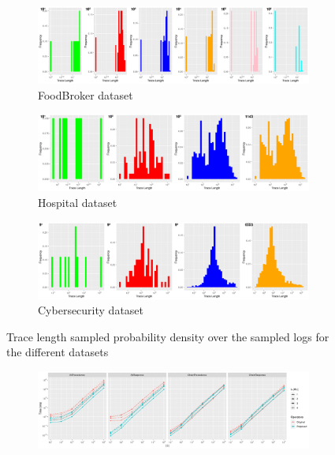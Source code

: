 \documentclass[sigconf]{acmart}
\begin{document}
\begin{figure}[!t]
\centering
\begin{subfigure}{\textwidth}
\centering
\includegraphics[width=\textwidth]{images/BrokerPDF.png}
\caption{FoodBroker dataset}\label{fbPDF}
\end{subfigure}
\begin{subfigure}{\textwidth}
\centering
\includegraphics[width=\textwidth]{images/HospitalPDF.png}
\caption{Hospital dataset}\label{hPDF}
\end{subfigure}
\begin{subfigure}{\textwidth}
\centering
\includegraphics[width=\textwidth]{images/CyberPDF.png}
\caption{Cybersecurity dataset}\label{cPDF}
\end{subfigure}
\caption{Trace length sampled probability density over the sampled logs for the different datasets}\label{fig:PDF}
\end{figure}\begin{figure}[!p]
\centering
\begin{subfigure}{\textwidth}
\centering
\includegraphics[width=\textwidth]{images/FoodBroker.png}

\end{subfigure}
\end{figure}
\end{document}
